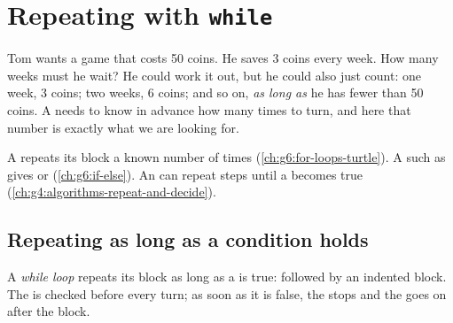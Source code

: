 \chapter{Repeating with \texttt{while}}\label{ch:g6:while-loops}

Tom wants a game that costs 50 coins. He saves 3 coins every week. How many
weeks must he wait? He could work it out, but he could also just count: one
week, 3 coins; two weeks, 6 coins; and so on, \emph{as long as} he has fewer
than 50 coins. A   needs to know in advance how many times to
turn, and here that number is exactly what we are looking for.

\begin{recall}
A   repeats its block a known number of times
(\cref{ch:g6:for-loops-turtle}). A  such as  gives
 or  (\cref{ch:g6:if-else}). An  can repeat
steps until a  becomes true (\cref{ch:g4:algorithms-repeat-and-decide}).
\end{recall}

\section{Repeating as long as a condition holds}

\begin{definition}\label{def:g6:while-loops:while}
A \emph{while loop} repeats its block as long as a 
is true:  followed by an indented block. The 
is checked before every turn; as soon as it is false, the  stops and the
 goes on after the block.
\end{definition}

\label{lst:g6:while-loops:countdown}

\label{out:g6:while-loops:countdown}

